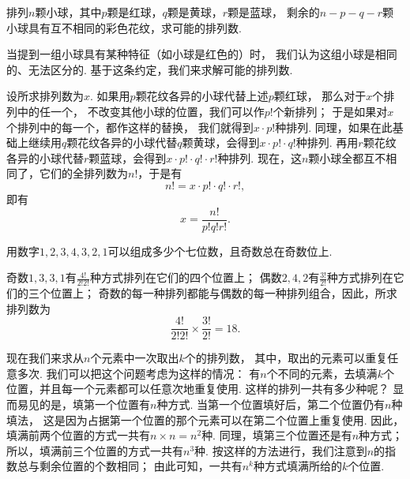 \begin{example}
排列\(n\)颗小球，其中\(p\)颗是红球，\(q\)颗是黄球，\(r\)颗是蓝球，
剩余的\(n-p-q-r\)颗小球具有互不相同的彩色花纹，求可能的排列数.
\begin{solution}
当提到一组小球具有某种特征（如小球是红色的）时，
我们认为这组小球是相同的、无法区分的.
基于这条约定，我们来求解可能的排列数.

设所求排列数为\(x\).
如果用\(p\)颗花纹各异的小球代替上述\(p\)颗红球，
那么对于\(x\)个排列中的任一个，
不改变其他小球的位置，我们可以作\(p!\)个新排列；
于是如果对\(x\)个排列中的每一个，都作这样的替换，
我们就得到\(x \cdot p!\)种排列.
同理，如果在此基础上继续用\(q\)颗花纹各异的小球代替\(q\)颗黄球，会得到\(x \cdot p! \cdot q!\)种排列.
再用\(r\)颗花纹各异的小球代替\(r\)颗蓝球，会得到\(x \cdot p! \cdot q! \cdot r!\)种排列.
现在，这\(n\)颗小球全都互不相同了，它们的全排列数为\(n!\)，于是有\begin{equation*}
	n! = x \cdot p! \cdot q! \cdot r!,
\end{equation*}即有\begin{equation*}
	x = \frac{n!}{p! q! r!}.
\end{equation*}
\end{solution}
\end{example}

\begin{example}
用数字\(1,2,3,4,3,2,1\)可以组成多少个七位数，且奇数总在奇数位上.
\begin{solution}
奇数\(1,3,3,1\)有\(\frac{4!}{2! 2!}\)种方式排列在它们的四个位置上；
偶数\(2,4,2\)有\(\frac{3!}{2!}\)种方式排列在它们的三个位置上；
奇数的每一种排列都能与偶数的每一种排列组合，因此，所求排列数为\begin{equation*}
	\frac{4!}{2! 2!} \times \frac{3!}{2!} = 18.
\end{equation*}
\end{solution}
\end{example}

现在我们来求从\(n\)个元素中一次取出\(k\)个的排列数，
其中，取出的元素可以重复任意多次.
我们可以把这个问题考虑为这样的情况：
有\(n\)个不同的元素，去填满\(k\)个位置，并且每一个元素都可以任意次地重复使用.
这样的排列一共有多少种呢？
显而易见的是，填第一个位置有\(n\)种方式.
当第一个位置填好后，第二个位置仍有\(n\)种填法，
这是因为占据第一个位置的那个元素可以在第二个位置上重复使用.
因此，填满前两个位置的方式一共有\(n \times n = n^2\)种.
同理，填第三个位置还是有\(n\)种方式；
所以，填满前三个位置的方式一共有\(n^3\)种.
按这样的方法进行，我们注意到\(n\)的指数总与剩余位置的个数相同；
由此可知，一共有\(n^k\)种方式填满所给的\(k\)个位置.

